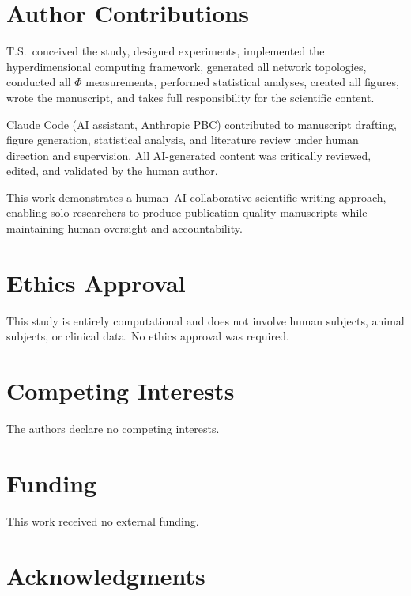 \documentclass[10pt,letterpaper]{article}
\renewcommand{\Phi}{\varPhi}
\begin{document}
\section*{Author Contributions}

T.S.\ conceived the study, designed experiments, implemented the hyperdimensional
computing framework, generated all network topologies, conducted all $\Phi$
measurements, performed statistical analyses, created all figures, wrote the
manuscript, and takes full responsibility for the scientific content.

Claude Code (AI assistant, Anthropic PBC) contributed to manuscript drafting,
figure generation, statistical analysis, and literature review under human
direction and supervision. All AI-generated content was critically reviewed,
edited, and validated by the human author.

This work demonstrates a human--AI collaborative scientific writing approach,
enabling solo researchers to produce publication-quality manuscripts while
maintaining human oversight and accountability.

\section*{Ethics Approval}

This study is entirely computational and does not involve human subjects,
animal subjects, or clinical data. No ethics approval was required.

\section*{Competing Interests}

The authors declare no competing interests.

\section*{Funding}

This work received no external funding.

\section*{Acknowledgments}
\end{document}
